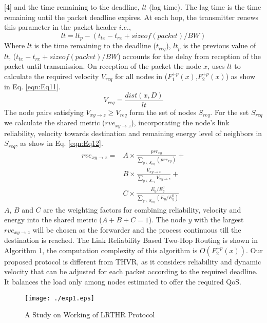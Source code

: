 \documentclass[fleqn,twoside]{article}
\begin{document}
[4] and the time remaining to the deadline, $lt$ (lag time). The lag time is the time remaining until the packet deadline expires. At each hop, the transmitter renews this
parameter in the packet header $i.e.$,
\begin{equation}
lt = lt_{p} - (t_{tx} - t_{rx} + sizeof(packet)/BW)
\label{eqn:Eq10}
\end{equation}
Where $lt$ is the time remaining to the deadline ($t_{req}$), $lt_{p}$ is the previous value 
of $lt$, ($t_{tx} - t_{rx} + sizeof(packet)/BW$) accounts for the delay 
from reception of the packet until transmission. On reception of the packet the node $x$, uses $lt$ to calculate the 
required velocity $V_{req}$ for all nodes in ($F_1^{+p}(x)$,$F_2^{+p}(x)$) as show in Eq. \ref{eqn:Eq11}.
\begin{equation}
V_{req} = \frac{dist(x,D)}{lt}
\label{eqn:Eq11}
\end{equation}
The node pairs satisfying $V_{xy\rightarrow z} \geq V_{req}$ form the set of nodes $S_{req}$. For the set $S_{req}$ we calculate 
the shared metric ($rve_{xy\rightarrow z}$), incorporating the node's link reliability, velocity towards destination and 
remaining energy level of neighbors in  $S_{req}$, as show in Eq. \ref{eqn:Eq12}.
\begin{equation}
\begin{split}
rve_{xy\rightarrow z} = &A \times \frac{prr_{xy}}{\displaystyle \sum_{y \in S_{req}}(prr_{xy})} + \\
	                &B \times \frac{V_{xy\rightarrow z}}{\displaystyle \sum_{y \in S_{req}}V_{xy\rightarrow z}} + \\
                        &C \times \frac{E_y/E_y^0}{\displaystyle \sum_{y \in S_{req}}(E_y/E_y^0)}
\label{eqn:Eq12}
\end{split}
\end{equation}
$A$, $B$ and $C$ are the weighting factors for combining reliability, velocity and energy into the shared metric ($A+B+C=1$). The node $y$ with the 
largest $rve_{xy\rightarrow z}$ will be chosen as the forwarder and the process continuous till the destination is reached. The
Link Reliability Based Two-Hop Routing is shown in Algorithm 1, the computation complexity of this algorithm is $O(F_2^{+p}(x))$. Our proposed protocol is different from THVR, as it considers
reliability and dynamic velocity that can be adjusted for each packet according to the required deadline. It balances the load only among nodes estimated to offer the required QoS.


\begin{figure}
\texttt{[image: ./exp1.eps]}
\begin{center}
\begin{small}
\caption{A Study on Working of LRTHR Protocol}
\end{small}
\end{center}
\end{figure}
\end{document}
